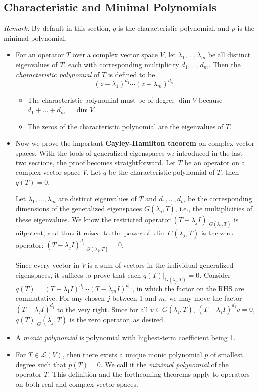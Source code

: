 \documentclass{article}
\newcommand{\df}[1]{\ul{\textit{#1}}}
\renewcommand{\d}{\dim}
\newcommand{\LV}{\mathcal{L}(V)}
\begin{document}
\subsection{Characteristic and Minimal Polynomials}
\textit{Remark.} By default in this section, $q$ is the characteristic polynomial, and $p$ is the minimal polynomial.
\begin{itemize}
    \item For an operator $T$ over a complex vector space $V$, let $\lambda_1, \dots, \lambda_m$ be all distinct eigenvalues of $T$, each with corresponding multiplicity $d_1,\dots, d_m$. Then the \df{characteristic polynomial} of $T$ is defined to be \[(z-\lambda_1)^{d_1}\cdots (z-\lambda_m)^{d_m}.\]
    \begin{itemize}
        \item The characteristic polynomial must be of degree $\d V$ because $d_1+\dots+d_m = \d V$.
        \item The zeros of the characteristic polynomial are the eigenvalues of $T$.
    \end{itemize}
    \item Now we prove the important \textbf{Cayley-Hamilton theorem} on complex vector spaces. With the tools of generalized eigenspaces we introduced in the last two sections, the proof becomes straightforward. Let $T$ be an operator on a complex vector space $V$. Let $q$ be the characteristic polynomial of $T$, then $q(T) = 0$.

    Let $\lambda_1,\dots,\lambda_m$ are distinct eigenvalues of $T$ and $d_1,\dots,d_m$ be the corresponding dimensions of the generalized eigenspaces $G(\lambda_j,T)$, i.e., the multiplicities of these eigenvalues. We know the restricted operator $(T - \lambda_j I)|_{G(\lambda_j,T)}$ is nilpotent, and thus it raised to the power of $\d G(\lambda_j,T)$ is the zero operator: $(T - \lambda_j I)^{d_j}|_{G(\lambda_j,T)} = 0$.

    Since every vector in $V$ is a sum of vectors in the individual generalized eigenspaces, it suffices to prove that each $q(T)|_{G(\lambda_j,T)} = 0$. Consider $q(T) = (T - \lambda_1 I)^{d_1} \cdots (T - \lambda_m I)^{d_m}$, in which the factor on the RHS are commutative. For any chosen $j$ between 1 and $m$, we may move the factor $(T - \lambda_j I)^{d_j}$ to the very right. Since for all $v \in G(\lambda_j,T)$, $(T - \lambda_j I)^{d_j}v = 0$, $q(T)|_G(\lambda_j,T)$ is the zero operator, as desired.

    \item A \df{monic polynomial} is polynomial with highest-term coefficient being 1.
    \item For $T \in \LV$, then there exists a unique monic polynomial $p$ of smallest degree such that $p(T)=0$. We call it the \df{minimal polynomial} of the operator $T$. This definition and the forthcoming theorems apply to operators on both real and complex vector spaces.
    

\end{itemize}
\end{document}
